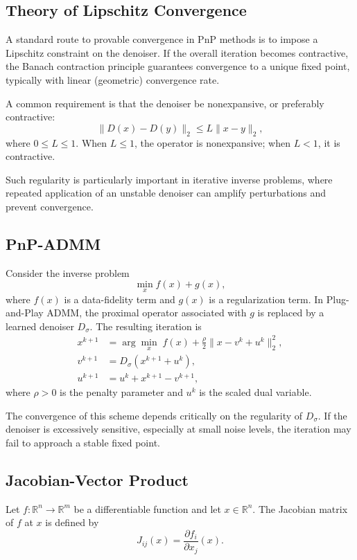 \documentclass{article}
\begin{document}
\subsection{Theory of Lipschitz Convergence}
A standard route to provable convergence in PnP methods is to impose a Lipschitz constraint on the denoiser.
If the overall iteration becomes contractive, the Banach contraction principle guarantees convergence to a unique fixed point, typically with linear (geometric) convergence rate.

A common requirement is that the denoiser be nonexpansive, or preferably contractive:
\begin{equation}
    \|D(x) - D(y)\|_2 \le L \|x - y\|_2,
\end{equation}
where $0 \le L \le 1$.
When $L \le 1$, the operator is nonexpansive; when $L < 1$, it is contractive.

Such regularity is particularly important in iterative inverse problems, where repeated application of an unstable denoiser can amplify perturbations and prevent convergence.

\subsection{PnP-ADMM}
Consider the inverse problem
\begin{equation}
    \min_x f(x) + g(x),
\end{equation}
where $f(x)$ is a data-fidelity term and $g(x)$ is a regularization term.
In Plug-and-Play ADMM, the proximal operator associated with $g$ is replaced by a learned denoiser $D_\sigma$.
The resulting iteration is
\begin{align}
    x^{k+1} &= \arg\min_x \; f(x) + \frac{\rho}{2}\|x - v^k + u^k\|_2^2, \\
    v^{k+1} &= D_\sigma(x^{k+1} + u^k), \\
    u^{k+1} &= u^k + x^{k+1} - v^{k+1},
\end{align}
where $\rho > 0$ is the penalty parameter and $u^k$ is the scaled dual variable.

The convergence of this scheme depends critically on the regularity of $D_\sigma$.
If the denoiser is excessively sensitive, especially at small noise levels, the iteration may fail to approach a stable fixed point.

\subsection{Jacobian-Vector Product}
Let $f : \mathbb{R}^n \to \mathbb{R}^m$ be a differentiable function and let $x \in \mathbb{R}^n$.
The Jacobian matrix of $f$ at $x$ is defined by
\begin{equation}
    J_{ij}(x) = \frac{\partial f_i}{\partial x_j}(x).
\end{equation}
\end{document}
